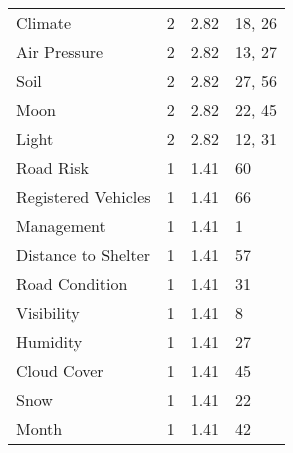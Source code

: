 \begin{longtable}[c]{@{}p{3.5cm}p{2.0cm}p{2.5cm}p{5.5cm}@{}}
  Climate &   2 & 2.82 & 18, 26 \\ 
  Air Pressure &   2 & 2.82 & 13, 27 \\ 
  Soil &   2 & 2.82 & 27, 56 \\ 
  Moon &   2 & 2.82 & 22, 45 \\ 
  Light &   2 & 2.82 & 12, 31 \\ 
  Road Risk &   1 & 1.41 & 60 \\ 
  Registered Vehicles &   1 & 1.41 & 66 \\ 
  Management &   1 & 1.41 & 1 \\ 
  Distance to Shelter &   1 & 1.41 & 57 \\ 
  Road Condition &   1 & 1.41 & 31 \\ 
  Visibility &   1 & 1.41 & 8 \\ 
  Humidity &   1 & 1.41 & 27 \\ 
  Cloud Cover &   1 & 1.41 & 45 \\ 
  Snow &   1 & 1.41 & 22 \\ 
  Month &   1 & 1.41 & 42 \\ 
   \hline
\end{longtable}

